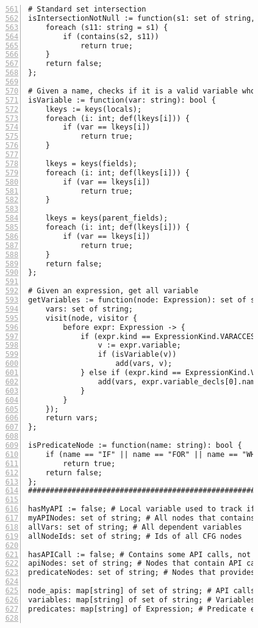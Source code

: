 \begin{figure}[ht!]
\begin{lstlisting}[numbers=left, tabsize=4, escapechar=@, caption={API Usage Mining Analysis},label={lst:aun-code},  firstline = 561, firstnumber = 561, lastline = 621]
# Standard set intersection
isIntersectionNotNull := function(s1: set of string, s2: set of string): bool {
    foreach (s11: string = s1) {
        if (contains(s2, s11))
            return true;
    }
    return false;
};

# Given a name, checks if it is a valid variable whose type is available
isVariable := function(var: string): bool {
    lkeys := keys(locals);
    foreach (i: int; def(lkeys[i])) {
        if (var == lkeys[i])
            return true;
    }
    
    lkeys = keys(fields);
    foreach (i: int; def(lkeys[i])) {
        if (var == lkeys[i])
            return true;
    }
    
    lkeys = keys(parent_fields);
    foreach (i: int; def(lkeys[i])) {
        if (var == lkeys[i])
            return true;
    }
    return false;
};

# Given an expression, get all variable
getVariables := function(node: Expression): set of string {
    vars: set of string;
    visit(node, visitor {
        before expr: Expression -> {
            if (expr.kind == ExpressionKind.VARACCESS) {
                v := expr.variable;
                if (isVariable(v))
                    add(vars, v);
            } else if (expr.kind == ExpressionKind.VARDECL) {
                add(vars, expr.variable_decls[0].name);
            }
        }
    });
    return vars;
};

isPredicateNode := function(name: string): bool {
    if (name == "IF" || name == "FOR" || name == "WHILE")
        return true;
    return false;
};
#########################################################

hasMyAPI := false; # Local variable used to track if a node contains API method of interest
myAPINodes: set of string; # All nodes that contains API methods of interest
allVars: set of string; # All dependent variables
allNodeIds: set of string; # Ids of all CFG nodes

hasAPICall := false; # Contains some API calls, not necessarily API call of interest
apiNodes: set of string; # Nodes that contain API calls
predicateNodes: set of string; # Nodes that provides predicates

node_apis: map[string] of set of string; # API calls at nodes
variables: map[string] of set of string; # Variables at nodes
predicates: map[string] of Expression; # Predicate expressions at nodes


\end{lstlisting}
\end{figure}
